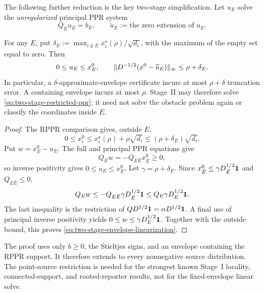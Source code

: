 The following further reduction is the key two-stage simplification.  Let
$u_E$ solve the \emph{unregularized} principal PPR system
\begin{equation}
 Q_Eu_E=b_E,
 \qquad \widetilde u_E:=\text{the zero extension of }u_E.
 \label{eq:two-stage-restricted-ppr}
\end{equation}

\begin{proposition}
\label{prop:two-stage-envelope-linearization}
For any $E$, put
$\delta_E:=\max_{i\notin E}x_i^\star(\rho)/\sqrt{d_i}$, with the maximum of
the empty set equal to zero.  Then
\begin{equation}
 0\leq u_E\leq x_E^0,
 \qquad
 \lVert D^{-1/2}(x^0-\widetilde u_E)\rVert_\infty
 \leq\rho+\delta_E.
 \label{eq:two-stage-envelope-linearization}
\end{equation}
In particular, a $\delta$-approximate-envelope certificate incurs at most
$\rho+\delta$ truncation error.  A containing envelope incurs at most
$\rho$.  Stage~II may therefore solve
\cref{eq:two-stage-restricted-ppr}; it need not solve the obstacle problem
again or classify the coordinates inside $E$.
\end{proposition}

\begin{proof}
The RPPR comparison gives, outside $E$,
\begin{equation*}
 0\leq x_i^0\leq x_i^\star(\rho)+\rho\sqrt{d_i}
 \leq(\rho+\delta_E)\sqrt{d_i}.
\end{equation*}
Put $w=x_E^0-u_E$.  The full and principal PPR equations give
\begin{equation*}
 Q_Ew=-Q_{E\bar E}x_{\bar E}^0\geq0,
\end{equation*}
so inverse positivity gives $0\leq u_E\leq x_E^0$.  Let
$\gamma=\rho+\delta_E$.  Since
$x_{\bar E}^0\leq\gamma D_{\bar E}^{1/2}\mathbf{1}$ and
$Q_{E\bar E}\leq0$,
\begin{equation*}
 Q_Ew
 \leq-Q_{E\bar E}\gamma D_{\bar E}^{1/2}\mathbf{1}
 \leq Q_E\gamma D_E^{1/2}\mathbf{1}.
\end{equation*}
The last inequality is the restriction of
$QD^{1/2}\mathbf{1}=\alpha D^{1/2}\mathbf{1}$.  A final use of principal inverse
positivity yields $0\leq w\leq\gamma D_E^{1/2}\mathbf{1}$.  Together with the
outside bound, this proves \cref{eq:two-stage-envelope-linearization}.
\end{proof}

\begin{remark}
The proof uses only $b\geq0$, the Stieltjes signs, and an envelope containing
the RPPR support.  It therefore extends to every nonnegative source
distribution.  The point-source restriction is needed for the strongest
known Stage~I locality, connected-support, and rooted-reporter results, not
for the fixed-envelope linear solve.
\end{remark}


